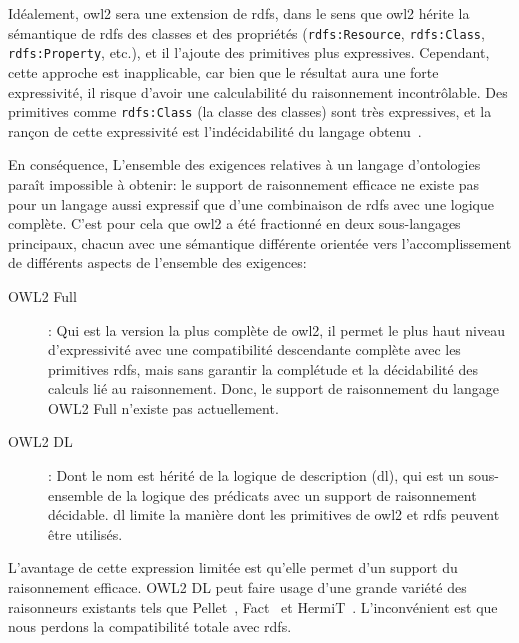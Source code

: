 Idéalement, \acrshort{owl2} sera une extension de \acrshort{rdfs},
dans le sens que \acrshort{owl2} hérite la sémantique de
\acrshort{rdfs} des classes et des propriétés (\texttt{rdfs:Resource},
\texttt{rdfs:Class}, \texttt{rdfs:Property}, etc.), et il l'ajoute des
primitives plus expressives. Cependant, cette approche est
inapplicable, car bien que le résultat aura une forte expressivité, il
risque d'avoir une calculabilité du raisonnement incontrôlable. Des
primitives comme \texttt{rdfs:Class} (la classe des classes) sont très
expressives, et la rançon de cette expressivité est l'indécidabilité
du langage obtenu~\cite{antoniou2012semantic}.\medskip

En conséquence, L'ensemble des exigences relatives à un langage
d'ontologies paraît impossible à obtenir: le support de raisonnement
efficace ne existe pas pour un langage aussi expressif que d'une
combinaison de \acrshort{rdfs} avec une logique complète. C'est pour
cela que \acrshort{owl2} a été fractionné en deux sous-langages
principaux, chacun avec une sémantique différente orientée vers
l'accomplissement de différents aspects de l'ensemble des exigences:

\renewcommand{\descriptionlabel}[1]{\hspace{0.5cm}\textbullet~\textsf{#1}}
\begin{description}
\item[OWL2 Full]: Qui est la version la plus complète de
  \acrshort{owl2}, il permet le plus haut niveau d'expressivité avec
  une compatibilité descendante complète avec les primitives
  \acrshort{rdfs}, mais sans garantir la complétude et la décidabilité
  des calculs lié au raisonnement. Donc, le support de raisonnement du
  langage \textsf{OWL2 Full} n'existe pas actuellement.

\item[OWL2 DL]: Dont le nom est hérité de la logique de description
  (\acrshort{dl}), qui est un sous-ensemble de la logique des
  prédicats avec un support de raisonnement décidable. \acrshort{dl}
  limite la manière dont les primitives de \acrshort{owl2} et
  \acrshort{rdfs} peuvent être utilisés.\medskip
\end{description}
\enddescription

L'avantage de cette expression limitée est qu'elle permet d'un support
du raisonnement efficace. \textsf{OWL2 DL} peut faire usage d'une
grande variété des raisonneurs existants tels que
Pellet~\cite{sirin2004pellet}, Fact~\cite{horrocks1999fact} et
HermiT~\cite{shearer2008hermit}. L'inconvénient est que nous perdons
la compatibilité totale avec \acrshort{rdfs}.\medskip


